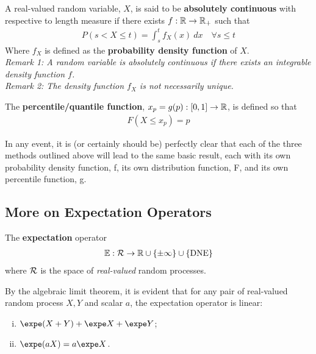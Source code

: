 \documentclass{article}
\begin{document}
   	\begin{definition}
   		A real-valued random variable, $X$, is said to be \textbf{absolutely continuous} with respective to length measure if there exists $f: \mathbb{R} \to \mathbb{R}_+$ such that
   		\begin{align}
   			P(s < X \leq t) = \int_s^t f_X(x)\ dx\quad \forall s \leq t
   		\end{align}
   		Where $f_X$ is defined as the \textbf{probability density function} of $X$. \\
   		\emph{Remark 1: A random variable is absolutely continuous if there exists an integrable density function $f$.} \\
   		\emph{Remark 2: The density function $f_X$ is not necessarily unique.}
   	\end{definition}
   	
   	\begin{definition}
   		The \textbf{percentile/quantile function}, $x_p = g(p): [0, 1] \to \mathbb{R}$, is defined so that
   		\begin{align}
   			F(X \leq x_p) = p
   		\end{align}
   	\end{definition}
   	
   	\begin{remark}
   		In any event, it is (or certainly should be) perfectly clear that each of the three methods outlined above will lead to the same basic result, each with its own probability density function, f, its own distribution function, F, and its own percentile function, g.
   	\end{remark}
   	
   	\subsection{More on Expectation Operators}
   	
   	\begin{remark}
   		The \textbf{expectation} operator
   		\begin{align}
   			\mathbb{E}: \mathcal{{R}} \to \mathbb{R} \cup \{\pm\infty\} \cup \{ \text{{DNE}} \}
   		\end{align}
   		where $\mathcal{{R}}$ is the space of \emph{real-valued} random processes.
   	\end{remark}
   	
   	\begin{theorem}
   		By the algebraic limit theorem, it is evident that for any pair of real-valued random process $X, Y$ and scalar $a$, the expectation operator is linear:
   		\begin{enumerate}[(i)]
   			\item $\expe (X+Y) + \expe X + \expe Y$;
   			\item $\expe (aX) = a \expe X$.
   		\end{enumerate}
   	\end{theorem}
   	
\end{document}
